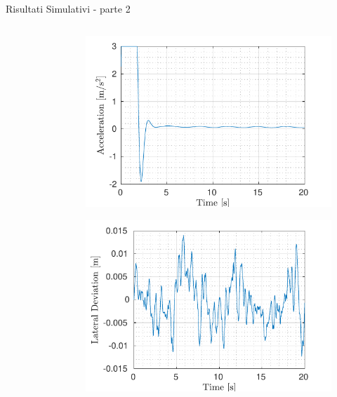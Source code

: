 \documentclass{beamer}
\begin{document}
\begin{frame}{Risultati Simulativi - parte 2}
\begin{columns}[onlytextwidth,T]
\begin{column}[c]{0.5\columnwidth}
\begin{figure}[!h]
				\end{figure}	
			\end{column}		
			\begin{column}[c]{0.5\columnwidth}
				\begin{figure}[!h]
				\includegraphics[width=0.92\columnwidth]{../../MATLAB/lane_following/figure/AccelerationVsTime.pdf}
				\vspace{-0.5em}
				\end{figure}
				\begin{figure}[!h]
				\vspace{-3em}	
				\includegraphics[width=0.92\columnwidth]{../../MATLAB/lane_following/figure/LateralDeviationVsTime.pdf}
				\vspace{-0.5em}
				\end{figure}
			\end{column}
		\end{columns}		
	\end{frame}
	
\end{document}
